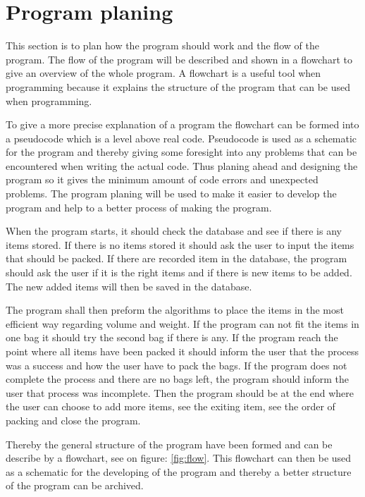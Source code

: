 \section{Program planing}
This section is to plan how the program should work and the flow of the program. The flow of the program will be described and shown in a flowchart to give an overview of the whole program. A flowchart is a useful tool when programming because it explains the structure of the program that can be used when programming.

To give a more precise explanation of a program the flowchart can be formed into a pseudocode which is a level above real code. Pseudocode is used as a schematic for the program and thereby giving some foresight into any problems that can be encountered when writing the actual code. Thus planing ahead and designing the program so it gives the minimum amount of code errors and unexpected problems.
The program planing will be used to make it easier to develop the program and help to a better process of making the program.

When the program starts, it should check the database and see if there is any items stored. If there is no items stored it should ask the user to input the items that should be packed. If there are recorded item in the database, the program should ask the user if it is the right items and if there is new items to be added. The new added items will then be saved in the database.

The program shall then preform the algorithms to place the items in the most efficient way regarding volume and weight. If the program can not fit the items in one bag it should try the second bag if there is any. If the program reach the point where all items have been packed it should inform the user that the process was a success and how the user have to pack the bags. If the program does not complete the process and there are no bags left, the program should inform the user that process was incomplete. Then the program should be at the end where the user can choose to add more items, see the exiting item, see the order of packing and close the program.


Thereby the general structure of the program have been formed and can be describe by a flowchart, see on figure: \ref{fig:flow}.
This flowchart can then be used as a schematic for the developing of the program and thereby a better structure of the program can be archived.
